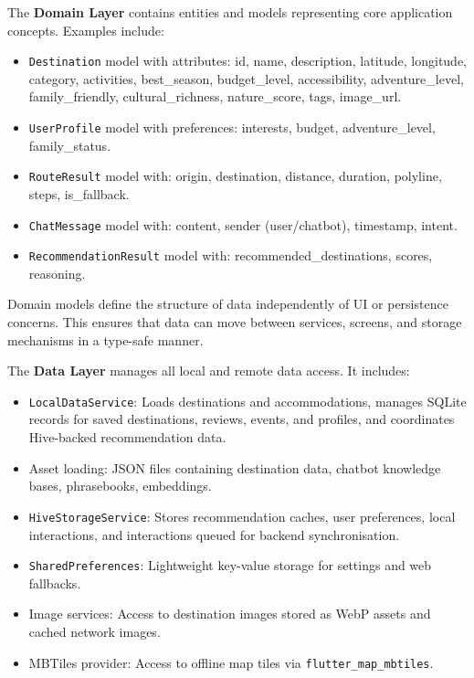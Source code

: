 \documentclass[12pt,a4paper,oneside]{report}
\begin{document}
The \textbf{Domain Layer} contains entities and models representing core application concepts. Examples include:

\begin{itemize}
\item \texttt{Destination} model with attributes: id, name, description, latitude, longitude, category, activities, best\_season, budget\_level, accessibility, adventure\_level, family\_friendly, cultural\_richness, nature\_score, tags, image\_url.
\item \texttt{UserProfile} model with preferences: interests, budget, adventure\_level, family\_status.
\item \texttt{RouteResult} model with: origin, destination, distance, duration, polyline, steps, is\_fallback.
\item \texttt{ChatMessage} model with: content, sender (user/chatbot), timestamp, intent.
\item \texttt{RecommendationResult} model with: recommended\_destinations, scores, reasoning.
\end{itemize}

Domain models define the structure of data independently of UI or persistence concerns. This ensures that data can move between services, screens, and storage mechanisms in a type-safe manner.

The \textbf{Data Layer} manages all local and remote data access. It includes:

\begin{itemize}
\item \texttt{LocalDataService}: Loads destinations and accommodations, manages SQLite records for saved destinations, reviews, events, and profiles, and coordinates Hive-backed recommendation data.
\item Asset loading: JSON files containing destination data, chatbot knowledge bases, phrasebooks, embeddings.
\item \texttt{HiveStorageService}: Stores recommendation caches, user preferences, local interactions, and interactions queued for backend synchronisation.
\item \texttt{SharedPreferences}: Lightweight key-value storage for settings and web fallbacks.
\item Image services: Access to destination images stored as WebP assets and cached network images.
\item MBTiles provider: Access to offline map tiles via \texttt{flutter\_map\_mbtiles}.
\end{itemize}
\end{document}
